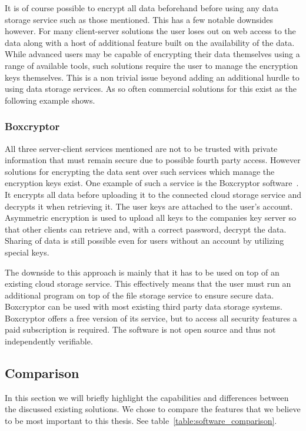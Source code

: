 It is of course possible to encrypt all data beforehand before using any data storage service such as those mentioned.
This has a few notable downsides however.
For many client-server solutions the user loses out on web access to the data along with a host of additional feature built on the availability of the data.
While advanced users may be capable of encrypting their data themselves using a range of available tools, such solutions require the user to manage the encryption keys themselves.
This is a non trivial issue beyond adding an additional hurdle to using data storage services.
As so often commercial solutions for this exist as the following example shows.

\subsubsection{Boxcryptor}
\label{subs:Boxcryptor}

All three server-client services mentioned are not to be trusted with private information that must remain secure due to possible fourth party access.
However solutions for encrypting the data sent over such services which manage the encryption keys exist.
One example of such a service is the Boxcryptor software~\cite{web:site:boxcryptor}.
It encrypts all data before uploading it to the connected cloud storage service and decrypts it when retrieving it.
The user keys are attached to the user's account.
Asymmetric encryption is used to upload all keys to the companies key server so that other clients can retrieve and, with a correct password, decrypt the data.
Sharing of data is still possible even for users without an account by utilizing special keys.

The downside to this approach is mainly that it has to be used on top of an existing cloud storage service.
This effectively means that the user must run an additional program on top of the file storage service to ensure secure data.
Boxcryptor can be used with most existing third party data storage systems.
Boxcryptor offers a free version of its service, but to access all security features a paid subscription is required.
The software is not open source and thus not independently verifiable.

\subsection{Comparison}
\label{sub:Comparison}

In this section we will briefly highlight the capabilities and differences between the discussed existing solutions.
We chose to compare the features that we believe to be most important to this thesis.
See table~\ref{table:software_comparison}.

